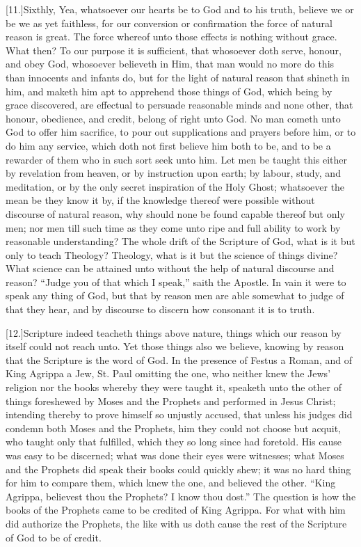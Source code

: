 [11.]Sixthly, Yea, whatsoever our hearts be to God and to his truth, believe we or be we as yet faithless, for our conversion or confirmation the force of natural reason is great. The force whereof unto those effects is nothing without grace. What then? To our purpose it is sufficient, that whosoever doth serve, honour, and obey God, whosoever believeth in Him, that man would no more do this than innocents and infants do, but for the light of natural reason that shineth in him, and maketh him apt to apprehend those things of God, which being by grace discovered, are effectual to persuade reasonable minds and none other, that honour, obedience, and credit, belong of right unto God. No man cometh unto God to offer him sacrifice, to pour out supplications and prayers before him, or to do him any service, which doth not first believe him both to be, and to be a rewarder of them who in such sort seek unto him. Let men be taught this either by revelation from heaven, or by instruction upon earth; by labour, study, and meditation, or by the only secret inspiration of the Holy Ghost; whatsoever the mean be they know it by, if the knowledge thereof were possible without discourse of natural reason, why should none be found capable thereof but only men; nor men till such time as they come unto ripe and full ability to work by reasonable understanding? The whole drift of the Scripture of God, what is it but only to teach Theology? Theology, what is it but the science of things divine? What science can be attained unto without the help of natural discourse and reason? “Judge you of that which I speak,” saith the Apostle. In vain it were to speak any thing of God, but that by reason men are able somewhat to judge of that they hear, and by discourse to discern how consonant it is to truth.

[12.]Scripture indeed teacheth things above nature, things  which our reason by itself could not reach unto. Yet those things also we believe, knowing by reason that the Scripture is the word of God. In the presence of Festus a Roman, and of King Agrippa a Jew, St. Paul omitting the one, who neither knew the Jews’ religion nor the books whereby they were taught it, speaketh unto the other of things foreshewed by Moses and the Prophets and performed in Jesus Christ; intending thereby to prove himself so unjustly accused, that unless his judges did condemn both Moses and the Prophets, him they could not choose but acquit, who taught only that fulfilled, which they so long since had foretold. His cause was easy to be discerned; what was done their eyes were witnesses; what Moses and the Prophets did speak their books could quickly shew; it was no hard thing for him to compare them, which knew the one, and believed the other. “King Agrippa, believest thou the Prophets? I know thou dost.” The question is how the books of the Prophets came to be credited of King Agrippa. For what with him did authorize the Prophets, the like with us doth cause the rest of the Scripture of God to be of credit.

